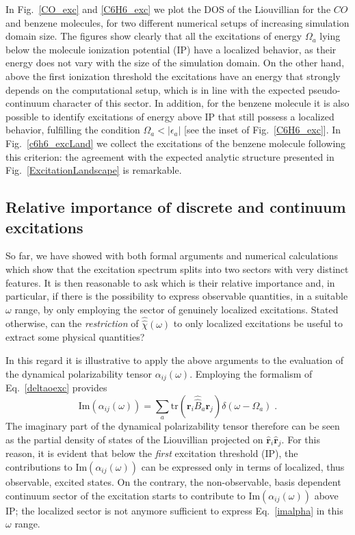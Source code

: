 \documentclass[reprint,aps,prb]{revtex4-1}
\newcommand{\eps}{\epsilon}
\newcommand{\be}{\begin{equation}}
\newcommand{\ee}{\end{equation}}
\newcommand{\lb}{\label}
\newcommand{\op}[1]{\hat {#1}}
\newcommand{\sop}[1]{\op{\op {#1}}}
\newcommand{\trace}[1]{\mathrm{tr}\left(#1\right)}
\begin{document}
In Fig.~\ref{CO_exc} and \ref{C6H6_exc} we plot the DOS of the Liouvillian for the $CO$ and benzene molecules,
for two different numerical setups of increasing simulation domain size.
The figures show clearly that all the excitations of energy $\Omega_a$ lying below the
molecule ionization potential (IP) have a localized behavior, as their energy does not vary with the size of the simulation domain.
On the other hand, above the first ionization threshold the excitations have an energy that strongly depends on the computational
setup, which is in line with the expected pseudo-continuum character of this sector.
In addition, for the benzene molecule it is also possible to
identify excitations of energy above IP that still possess a localized behavior, fulfilling the condition $\Omega_a < |\eps_a|$ [see the inset of
Fig.~\ref{C6H6_exc}]. In Fig.~\ref{c6h6_excLand} we collect the excitations of the benzene molecule following this criterion:
the agreement with the expected analytic structure presented in Fig.~\ref{ExcitationLandscape} is remarkable.

\subsection{Relative importance of discrete and continuum excitations}

So far, we have showed with both formal arguments and numerical calculations which show that the excitation spectrum splits into two sectors with very distinct features.
It is then reasonable to ask which is their relative importance and, in particular, if there is the possibility to express observable quantities, in a suitable $\omega$ range, by only employing the sector of genuinely localized excitations.
Stated otherwise, can the \emph{restriction} of $\sop \chi(\omega)$ to only localized excitations be useful to extract some physical quantities?

In this regard it is illustrative to apply the above arguments to the evaluation of the dynamical polarizability tensor $\alpha_{ij}(\omega)$.
Employing the formalism of Eq.~\eqref{deltaoexc} provides
\be\lb{imalpha}
\mathrm{Im}\left(\alpha_{ij}(\omega) \right) =
\sum_{a} \trace{\mathbf r_i \sop B_a \mathbf r_j} \delta(\omega - \Omega_a) \;.
\ee
The imaginary part of the dynamical polarizability tensor therefore can be seen as the partial density of states of the Liouvillian projected on
$\op{\mathbf r}_i\op{\mathbf r}_j$. For this reason, it is evident that below the \emph{first} excitation threshold (IP), the contributions to $\mathrm{Im}\left(\alpha_{ij}(\omega)\right)$ can be expressed only in terms of localized, thus observable, excited states. On the contrary, the non-observable, basis dependent continuum sector of the excitation starts to contribute to $\mathrm{Im}\left(\alpha_{ij}(\omega)\right)$ above IP; the localized sector is not anymore sufficient to express Eq.~\eqref{imalpha} in this $\omega$ range.
\end{document}

